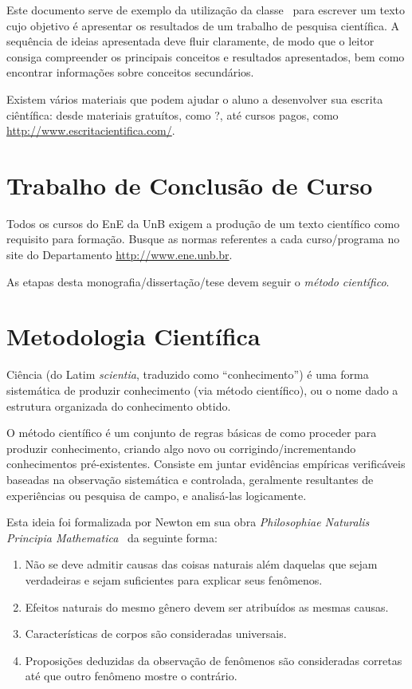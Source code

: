 Este documento serve de exemplo da utilização da classe \unbene\ para escrever um texto cujo 
objetivo é apresentar os resultados de um trabalho de pesquisa científica. A sequência de ideias 
apresentada deve fluir claramente, de modo que o leitor consiga compreender os principais conceitos 
e resultados apresentados, bem como encontrar informações sobre conceitos secundários.

Existem vários materiais que podem ajudar o aluno a desenvolver sua escrita ciêntífica: desde
materiais gratuítos, como ?, até cursos pagos, como \url{http://www.escritacientifica.com/}.

\section{Trabalho de Conclusão de Curso}%
Todos os cursos do \acrfull{EnE} da \acrfull{UnB} exigem a produção de um texto científico como 
requisito para formação. Busque as normas referentes a cada curso/programa no site do Departamento
\url{http://www.ene.unb.br}.

As etapas desta monografia/dissertação/tese devem seguir o \emph{método científico}.

\section{Metodologia Científica}%
Ciência (do Latim \emph{scientia}, traduzido como ``conhecimento'') é uma forma sistemática de 
produzir conhecimento (via método científico), ou o nome dado a estrutura organizada do conhecimento 
obtido.

O método científico é um conjunto de regras básicas de como proceder para produzir conhecimento, 
criando algo novo ou corrigindo/incrementando conhecimentos pré-existentes. Consiste em juntar 
evidências empíricas verificáveis baseadas na observação sistemática e controlada, geralmente 
resultantes de experiências ou pesquisa de campo, e analisá-las logicamente.

Esta ideia foi formalizada por Newton em sua obra \emph{Philosophiae Naturalis Principia 
Mathematica}~\cite{newton1833philosophiae} da seguinte forma:
\begin{enumerate}
	\item Não se deve admitir causas das coisas naturais além daquelas que sejam verdadeiras e 
	sejam suficientes para explicar seus fenômenos.
	\item Efeitos naturais do mesmo gênero devem ser atribuídos as mesmas causas.
	\item Características de corpos são consideradas universais.
	\item Proposições deduzidas da observação de fenômenos são consideradas corretas até que outro 
	fenômeno mostre o contrário.
\end{enumerate}%

